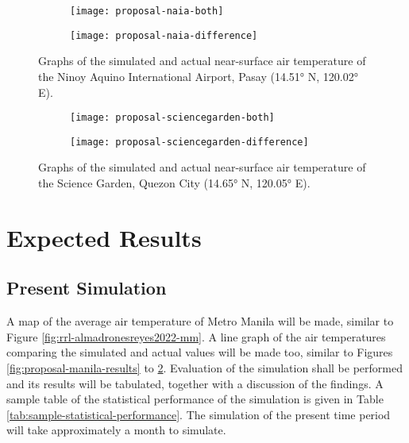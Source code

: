 	\begin{figure}
		\centering
		\begin{subfigure}{\textwidth}
			\texttt{[image: proposal-naia-both]}
		\end{subfigure}
		\begin{subfigure}{\textwidth}
			\texttt{[image: proposal-naia-difference]}
		\end{subfigure}
		\caption{
			Graphs of the simulated and actual near-surface air temperature of the Ninoy Aquino International Airport, Pasay (\ang{14.51} N, \ang{120.02} E).
		}
		\label{fig:proposal-naia-results}
	\end{figure}

	\begin{figure}
		\centering
		\begin{subfigure}{\textwidth}
			\texttt{[image: proposal-sciencegarden-both]}
		\end{subfigure}
		\begin{subfigure}{\textwidth}
			\texttt{[image: proposal-sciencegarden-difference]}
		\end{subfigure}
		\caption{
			Graphs of the simulated and actual near-surface air temperature of the Science Garden, Quezon City (\ang{14.65} N, \ang{120.05} E).
		}
		\label{fig:proposal-sciencegarden-results}
	\end{figure}

\section{Expected Results}
	\subsection{Present Simulation}
		A map of the average air temperature of Metro Manila will be made, similar to Figure \ref{fig:rrl-almadronesreyes2022-mm}.
		A line graph of the air temperatures comparing the simulated and actual values will be made too, similar to Figures \ref{fig:proposal-manila-results} to \ref{fig:proposal-sciencegarden-results}.
		Evaluation of the simulation shall be performed and its results will be tabulated, together with a discussion of the findings.
		A sample table of the statistical performance of the simulation is given in Table \ref{tab:sample-statistical-performance}.
		The simulation of the present time period will take approximately a month to simulate.

